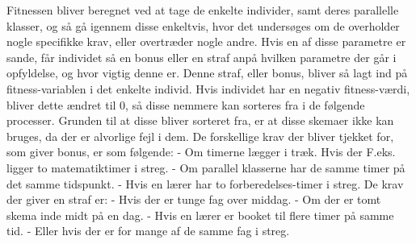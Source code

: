 Fitnessen bliver beregnet ved at tage de enkelte individer, samt deres parallelle klasser, og så gå igennem disse enkeltvis, hvor det undersøges om de overholder nogle specifikke krav, eller overtræder nogle andre. Hvis en af disse parametre er sande, får individet så en bonus eller en straf anpå hvilken parametre der går i opfyldelse, og hvor vigtig denne er. Denne straf, eller bonus, bliver så lagt ind på fitness-variablen i det enkelte individ. Hvis individet har en negativ fitness-værdi, bliver dette ændret til 0, så disse nemmere kan sorteres fra i de følgende processer. Grunden til at disse bliver sorteret fra, er at disse skemaer ikke kan bruges, da der er alvorlige fejl i dem.
De forskellige krav der bliver tjekket for, som giver bonus, er som følgende:
-	Om timerne lægger i træk. Hvis der F.eks. ligger to matematiktimer i streg.
-	Om parallel klasserne har de samme timer på det samme tidspunkt. 
-	Hvis en lærer har to forberedelses-timer i streg.
De krav der giver en straf er:
-	Hvis der er tunge fag over middag.
-	Om der er tomt skema inde midt på en dag.
-	Hvis en lærer er booket til flere timer på samme tid.
-	Eller hvis der er for mange af de samme fag i streg.

